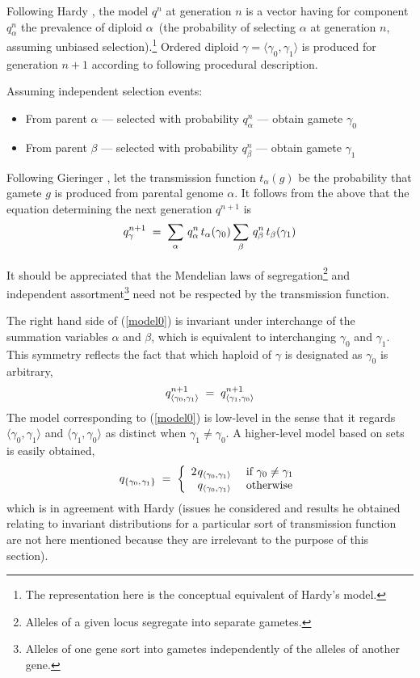 Following Hardy \cite{Hardy1908}, the model $q^{n}$ at generation $n$
is a vector having for component $q_\alpha^n$ the prevalence of
diploid $\alpha\,$ (the probability of selecting $\alpha$ \nudge at
generation $n$, assuming unbiased selection).\footnote{The
  representation here is the conceptual equivalent of Hardy's model.}
Ordered diploid $\gamma = \langle \gamma_0, \gamma_1 \rangle$ is
produced for generation $n+1$ according to following procedural
description.

  Assuming independent selection events:
\begin{itemize}
\item From parent $\alpha$ --- selected with probability
  $q_\alpha^n$ --- obtain gamete $\gamma_0$
\item From parent $\beta$ --- selected with probability $q_\beta^n$
  --- obtain gamete $\gamma_1$
\end{itemize}
Following Gieringer \cite{Geiringer1944}, let the transmission
function $t_\alpha(g)$ be the probability that gamete $g$ is produced
from parental genome $\alpha$.  It follows from the above that the
equation determining the next generation $q^{n+1}$ is
\begin{equation}
\label{model0}
q_\gamma^{n+1} \; = \;
\sum_{\alpha} \, q_\alpha^n \, t_\alpha(\gamma_0) 
\sum_{\beta} \,q_\beta^n \, t_\beta(\gamma_1)\\[-.05in]
\end{equation}

It should be appreciated that the Mendelian \cite{Mendel1866} laws of
segregation\footnote{Alleles of a given locus segregate into separate
  gametes.} and independent assortment\footnote{Alleles of one gene
  sort into gametes independently of the alleles of another gene.}
need not be respected by the transmission function.


The right hand side of (\ref{model0}) is invariant under interchange
of the summation variables $\alpha$ and $\beta$, which is equivalent
to interchanging $\gamma_0$ and $\gamma_1$.  This symmetry reflects
the fact that which haploid of $\gamma$ is designated as $\gamma_0$ is
arbitrary,\\[-.05in]
\[
q_{\langle \gamma_0, \gamma_1 \rangle}^{n+1} \; = \;
q_{\langle \gamma_1, \gamma_0 \rangle}^{n+1}\\[.1in]
\]
The model corresponding to (\ref{model0}) is low-level in the sense
that it regards $\langle \gamma_0, \gamma_1 \rangle$ and $\langle
\gamma_1, \gamma_0 \rangle$ as distinct when $\gamma_1 \neq \gamma_0$.
A higher-level model based on sets is easily obtained,
\[
q_{\{\gamma_0, \nudge \gamma_1\}} \; = \; \left\{
\begin{array}{ll}
2 \nudge q_{\langle \gamma_0, \gamma_1 \rangle} & \mbox{ if $\gamma_0 \neq \gamma_1$}\\
\phantom{2 \nudge }q_{\langle \gamma_0, \gamma_1 \rangle} & \mbox{ otherwise}
\end{array}
\right.\\[.05in]
\]
which is in agreement with Hardy\cite{Hardy1908} (issues he considered
and results he obtained relating to invariant distributions for a
particular sort of transmission function are not here mentioned
because they are irrelevant to the purpose of this section).

